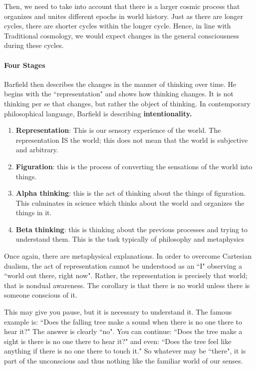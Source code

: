 Then, we need to take into account that there is a larger cosmic process that organizes and unites different epochs in world history. Just as there are longer cycles, there are shorter cycles within the longer cycle. Hence, in line with Traditional cosmology, we would expect changes in the general consciousness during these cycles.

\paragraph{Four Stages}
Barfield then describes the changes in the manner of thinking over time. He begins with the ``representation" and shows how thinking changes. It is not thinking per se that changes, but rather the object of thinking. In contemporary philosophical language, Barfield is describing \textbf{intentionality.}

\begin{enumerate}
\item \textbf{Representation}: This is our sensory experience of the world. The representation IS the world; this does not mean that the world is subjective and arbitrary. 
\item \textbf{Figuration}: this is the process of converting the sensations of the world into things. 
\item \textbf{Alpha thinking}: this is the act of thinking about the things of figuration. This culminates in science which thinks about the world and organizes the things in it. 
\item \textbf{Beta thinking}: this is thinking about the previous processes and trying to understand them. This is the task typically of philosophy and metaphysics 
\end{enumerate}
Once again, there are metaphysical explanations. In order to overcome Cartesian dualism, the act of representation cannot be understood as an ``I" observing a ``world out there, right now". Rather, the representation is precisely that world; that is nondual awareness. The corollary is that there is no world unless there is someone conscious of it.

This may give you pause, but it is necessary to understand it. The famous example is: ``Does the falling tree make a sound when there is no one there to hear it?" The answer is clearly ``no". You can continue: ``Does the tree make a sight is there is no one there to hear it?" and even: ``Does the tree feel like anything if there is no one there to touch it." So whatever may be ``there", it is part of the unconscious and thus nothing like the familiar world of our senses.

